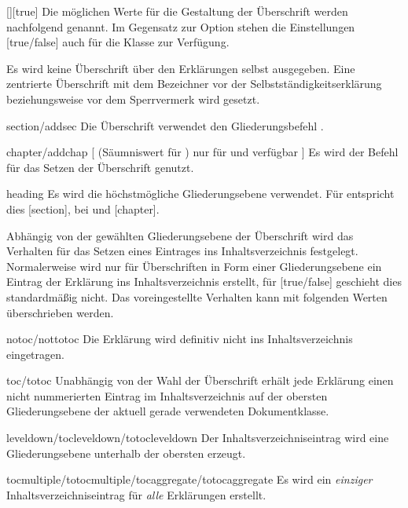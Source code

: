 \begin{Declaration}{[\PSet]}[true]
Die möglichen Werte für die Gestaltung der Überschrift werden nachfolgend 
genannt. Im Gegensatz zur Option  stehen die Einstellungen 
[true/false] auch für die Klasse  zur 
Verfügung.
%
\begin{values}
\itemfalse
  Es wird keine Überschrift über den Erklärungen selbst ausgegeben.
\itemtrue*
  Eine zentrierte Überschrift mit dem Bezeichner  vor 
  der Selbstständigkeitserklärung beziehungsweise  vor dem 
  Sperrvermerk wird gesetzt. 
\item[section/addsec]
  Die Überschrift verwendet den Gliederungsbefehl .
\item[chapter/addchap][%
    (Säumniswert für \Class{tudscrbook})
    nur für \Class{tudscrreprt} und \Class{tudscrbook} verfügbar%
  ]
  Es wird der Befehl  für das Setzen der Überschrift genutzt. 
\item[heading]
  Es wird die höchstmögliche Gliederungsebene verwendet. Für 
   entspricht dies [section], bei 
   und  [chapter].
\end{values}
%
Abhängig von der gewählten Gliederungsebene der Überschrift wird das Verhalten 
für das Setzen eines Eintrages ins Inhaltsverzeichnis festgelegt. Normalerweise 
wird nur für Überschriften in Form einer Gliederungsebene ein Eintrag der 
Erklärung ins Inhaltsverzeichnis erstellt, für [true/false] 
geschieht dies standardmäßig nicht. Das voreingestellte Verhalten kann mit 
folgenden Werten überschrieben werden.
%
\begin{values}
\item[notoc/nottotoc]
  Die Erklärung wird definitiv nicht ins Inhaltsverzeichnis eingetragen.
\item[toc/totoc]
  Unabhängig von der Wahl der Überschrift erhält jede Erklärung einen nicht
  nummerierten Eintrag im Inhaltsverzeichnis auf der obersten Gliederungsebene  
  der aktuell gerade verwendeten Dokumentklasse. 
\item[leveldown/tocleveldown/totocleveldown]
  Der Inhaltsverzeichniseintrag wird eine Gliederungsebene unterhalb der 
  obersten erzeugt.
\item[tocmultiple/totocmultiple/tocaggregate/totocaggregate]
  Es wird ein \emph{einziger} Inhaltsverzeichniseintrag für \emph{alle} 
  Erklärungen erstellt.
\end{values}

\end{Declaration}
